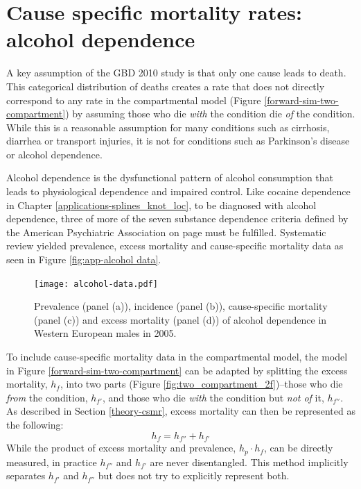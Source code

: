\chapter{Cause specific mortality rates: alcohol dependence}
\label{applications-csmr}

A key assumption of the GBD 2010 study is that only one cause leads to
death.  This categorical distribution of deaths creates a rate that
does not directly correspond to any rate in the compartmental model
(Figure \ref{forward-sim-two-compartment}) by assuming those who die
\emph{with} the condition die \emph{of} the condition.  While this is
a reasonable assumption for many conditions such as cirrhosis,
diarrhea or transport injuries, it is not for conditions such as
Parkinson's disease or alcohol dependence.

Alcohol dependence is the dysfunctional pattern of alcohol consumption
that leads to physiological dependence and impaired control.  Like
cocaine dependence in Chapter \ref{applications-splines_knot_loc}, to
be diagnosed with alcohol dependence, three of more of the seven
substance dependence criteria defined by the American Psychiatric
Association on page \pageref{page:app-substance_dependence} must be
fulfilled. \cite{association_diagnostic_2000, hasin_prevalence_2007}
Systematic review yielded prevalence, excess mortality and
cause-specific mortality data as seen in Figure \ref{fig:app-alcohol
  data}.

    \begin{figure}[h]
        \begin{center}
            \texttt{[image: alcohol-data.pdf]}
            \caption{Prevalence (panel (a)), incidence (panel (b)),
              cause-specific mortality (panel (c)) and excess
              mortality (panel (d)) of alcohol dependence in Western
              European males in 2005.}
            \label{fig:app-alcohol data}
        \end{center}
    \end{figure}

To include cause-specific mortality data in the compartmental model,
the model in Figure \ref{forward-sim-two-compartment} can be adapted
by splitting the excess mortality, $h_{f}$, into two parts (Figure
\ref{fig:two_compartment_2f})--those who die \emph{from} the
condition, $h_{f'}$, and those who die \emph{with} the condition but
\emph{not of} it, $h_{f''}$.  As described in Section
\ref{theory-csmr}, excess mortality can then be represented as the
following:
    \begin{equation}
        h_{f} = h_{f''} + h_{f'}
    \end{equation}
While the product of excess mortality and prevalence, $h_{p} \cdot h_{f}$,
can be directly measured, in practice $h_{f''}$ and $h_{f'}$ are never
disentangled.  This method implicitly separates $h_{f'}$ and $h_{f''}$
but does not try to explicitly represent both.

